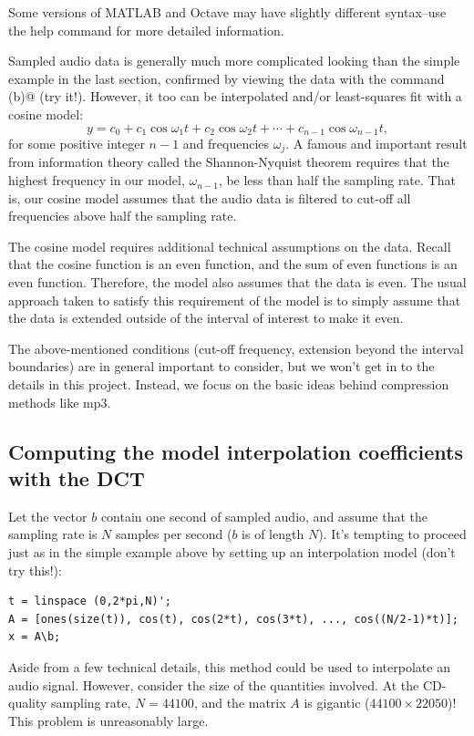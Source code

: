 \documentclass[10pt]{article}
\begin{document}
Some versions of MATLAB and Octave may have slightly different syntax--use the
help command for more detailed information. 
 
Sampled audio data is generally much more complicated looking than the simple
example in the last section, confirmed by viewing the data with the command
\verb@plot(b)@ (try it!). However, it too can be interpolated and/or
least-squares fit with a cosine model:
\[
y = c_0 + c_1\cos\omega_1t + c_2\cos\omega_2t + \cdots + c_{n-1}\cos\omega_{n-1}t,
\]
for some positive integer $n-1$ and frequencies ${\omega_j}$.  A famous and
important result from information theory called the Shannon-Nyquist theorem
requires that the highest frequency in our model, $\omega_{n - 1}$,  be less
than half the sampling rate. That is, our cosine model assumes that the audio
data is filtered to cut-off all frequencies above half the sampling rate. 

The cosine model requires additional technical assumptions on the data.  Recall
that the cosine function is an even function, and the sum of even functions is
an even function. Therefore, the model also assumes that the data is even. The
usual approach taken to satisfy this requirement of the model is to simply
assume that the data is extended outside of the interval of interest to make it
even.

The above-mentioned conditions (cut-off frequency, extension beyond the
interval boundaries) are in general important to consider, but we won't get in
to the details in this project.  Instead, we focus on the basic ideas behind
compression methods like mp3. 

\subsection*{Computing the model interpolation coefficients with the DCT}

Let the vector $b$ contain one second of sampled audio, and assume that the
sampling rate is $N$ samples per second ($b$ is of length $N$).  It's tempting
to proceed just as in the simple example above by setting up an interpolation
model  (don't try this!):

\begin{verbatim}
t = linspace (0,2*pi,N)';
A = [ones(size(t)), cos(t), cos(2*t), cos(3*t), ..., cos((N/2-1)*t)];
x = A\b;
\end{verbatim}
Aside from a few technical details, this method could be used to interpolate
an audio signal. However, consider the size of the quantities involved.
At the CD-quality sampling rate, $N=44100$, and the matrix $A$ is
gigantic ($44100\times 22050$)!  This problem is unreasonably large.
\end{document}
